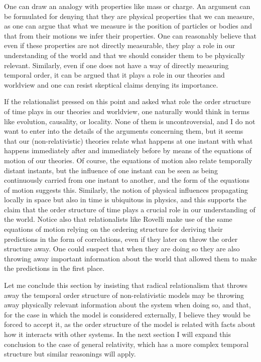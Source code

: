 \documentclass[12 pt]{article}
\begin{document}
One can draw an analogy with properties like mass or charge. An argument can be formulated for denying that they are physical properties that we can measure, as one can argue that what we measure is the position of particles or bodies and that from their motions we infer their properties. One can reasonably believe that even if these properties are not directly measurable, they play a role in our understanding of the world and that we should consider them to be physically relevant. Similarly, even if one does not have a way of directly measuring temporal order, it can be argued that it plays a role in our theories and worldview and one can resist skeptical claims denying its importance.

If the relationalist pressed on this point and asked what role the order structure of time plays in our theories and worldview, one naturally would think in terms like evolution, causality, or locality. None of them is uncontroversial, and I do not want to enter into the details of the arguments concerning them, but it seems that our (non-relativistic) theories relate what happens at one instant with what happens immediately after and immediately before by means of the equations of motion of our theories. Of course, the equations of motion also relate temporally distant instants, but the influence of one instant can be seen as being continuously carried from one instant to another, and the form of the equations of motion suggests this. Similarly, the notion of physical influences propagating locally in space but also in time is ubiquitous in physics, and this supports the claim that the order structure of time plays a crucial role in our understanding of the world. Notice also that relationalists like Rovelli make use of the same equations of motion relying on the ordering structure for deriving their predictions in the form of correlations, even if they later on throw the order structure away. One could suspect that when they are doing so they are also throwing away important information about the world that allowed them to make the predictions in the first place.

Let me conclude this section by insisting that radical relationalism that throws away the temporal order structure of non-relativistic models may be throwing away physically relevant information about the system when doing so, and that, for the case in which the model is considered externally, I believe they would be forced to accept it, as the order structure of the model is related with facts about how it interacts with other systems. In the next section I will expand this conclusion to the case of general relativity, which has a more complex temporal structure but similar reasonings will apply.
\end{document}
